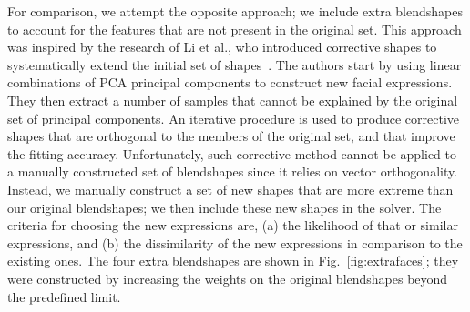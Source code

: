 For comparison, we attempt the opposite approach; we include extra blendshapes to account for the features that are not present in the original set. This approach was inspired by the research of Li et al., who introduced corrective shapes to systematically extend the initial set of shapes~\cite{Li:2013}. The authors start by using linear combinations of PCA principal components to construct new facial expressions. They then extract a number of samples that cannot be explained by the original set of principal components. An iterative procedure is used to produce corrective shapes that are orthogonal to the members of the original set, and that improve the fitting accuracy. Unfortunately, such corrective method cannot be applied to a manually constructed set of blendshapes since it relies on vector orthogonality. Instead, we manually construct a set of new shapes that are more extreme than our original blendshapes; we then include these new shapes in the solver. The criteria for choosing the new expressions are, (a) the likelihood of that or similar expressions, and (b) the dissimilarity of the new expressions in comparison to the existing ones. The four extra blendshapes are shown in Fig.~\ref{fig:extrafaces}; they were constructed by increasing the weights on the original blendshapes beyond the predefined limit. 
